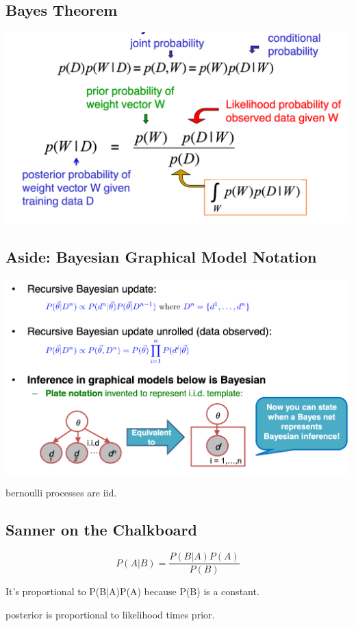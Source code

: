 \documentclass[11pt]{article}
\theoremstyle{definition}
\begin{document}
\subsection{Bayes Theorem}
\includegraphics[width=\textwidth/2]{10.png}

\subsection{Aside: Bayesian Graphical Model Notation}
\includegraphics[width=\textwidth]{11.png}

bernoulli processes are iid.

\subsection{Sanner on the Chalkboard}

\begin{equation}
    P(A|B) = \frac{P(B|A)P(A)}{P(B)}
\end{equation}

It's proportional to P(B|A)P(A) because P(B) is a constant.

posterior is proportional to likelihood times prior.
\end{document}
